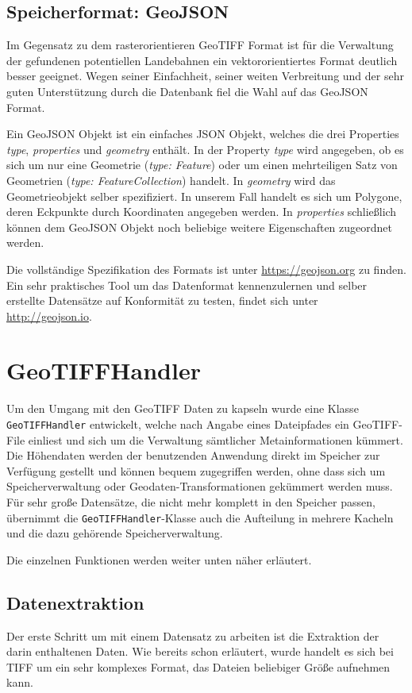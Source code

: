 \documentclass[10pt,a4paper]{report}
\begin{document}
\subsection{Speicherformat: GeoJSON}
Im Gegensatz zu dem rasterorientieren GeoTIFF Format ist für die Verwaltung der gefundenen potentiellen Landebahnen ein vektororientiertes Format deutlich besser geeignet. Wegen seiner Einfachheit, seiner weiten Verbreitung und der sehr guten Unterstützung durch die Datenbank fiel die Wahl auf das GeoJSON Format.

Ein GeoJSON Objekt ist ein einfaches JSON Objekt, welches die drei Properties \emph{type}, \emph{properties} und \emph{geometry} enthält. In der Property \emph{type} wird angegeben, ob es sich um nur eine Geometrie (\emph{type: Feature}) oder um einen mehrteiligen Satz von Geometrien (\emph{type: FeatureCollection}) handelt. In \emph{geometry} wird das Geometrieobjekt selber spezifiziert. In unserem Fall handelt es sich um Polygone, deren Eckpunkte durch Koordinaten angegeben werden. In \emph{properties} schließlich können dem GeoJSON Objekt noch beliebige weitere Eigenschaften zugeordnet werden.

Die vollständige Spezifikation des Formats ist unter \url{https://geojson.org} zu finden. Ein sehr praktisches Tool um das Datenformat kennenzulernen und selber erstellte Datensätze auf Konformität zu testen, findet sich unter \url{http://geojson.io}.

\section{GeoTIFFHandler}

Um den Umgang mit den GeoTIFF Daten zu kapseln wurde eine Klasse \texttt{GeoTIFFHandler} entwickelt, welche nach Angabe eines Dateipfades ein GeoTIFF-File einliest und sich um die Verwaltung sämtlicher Metainformationen kümmert. Die Höhendaten werden der benutzenden Anwendung direkt im Speicher zur Verfügung gestellt und können bequem zugegriffen werden, ohne dass sich um Speicherverwaltung oder Geodaten-Transformationen gekümmert werden muss. Für sehr große Datensätze, die nicht mehr komplett in den Speicher passen, übernimmt die \texttt{GeoTIFFHandler}-Klasse auch die Aufteilung in mehrere Kacheln und die dazu gehörende Speicherverwaltung.

Die einzelnen Funktionen werden weiter unten näher erläutert.

\subsection{Datenextraktion}
Der erste Schritt um mit einem Datensatz zu arbeiten ist die Extraktion der darin enthaltenen Daten. Wie bereits schon erläutert, wurde handelt es sich bei TIFF um ein sehr komplexes Format, das Dateien beliebiger Größe aufnehmen kann.
\end{document}
